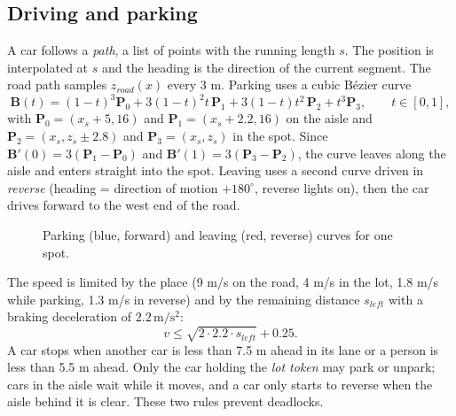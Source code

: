 \subsection{Driving and parking}
A car follows a \emph{path}, a list of points with the running length $s$. The position is interpolated at $s$ and the
heading is the direction of the current segment. The road path samples $z_{road}(x)$ every 3 m. Parking uses a cubic
Bézier curve
\[
\mathbf{B}(t) = (1-t)^3\mathbf{P}_0 + 3(1-t)^2t\,\mathbf{P}_1 + 3(1-t)t^2\,\mathbf{P}_2 + t^3\mathbf{P}_3,\qquad t\in[0,1],
\]
with $\mathbf{P}_0=(x_s+5,16)$ and $\mathbf{P}_1=(x_s+2.2,16)$ on the aisle and $\mathbf{P}_2=(x_s,z_s\pm2.8)$ and
$\mathbf{P}_3=(x_s,z_s)$ in the spot. Since $\mathbf{B}'(0)=3(\mathbf{P}_1-\mathbf{P}_0)$ and $\mathbf{B}'(1)=3(\mathbf{P}_3-\mathbf{P}_2)$,
the curve leaves along the aisle and enters straight into the spot. Leaving uses a second curve driven in
\emph{reverse} (heading = direction of motion $+180^\circ$, reverse lights on), then the car drives forward to the west end
of the road.
\begin{figure}[H]
\centering
{}
\caption{Parking (blue, forward) and leaving (red, reverse) curves for one spot.}
\end{figure}
The speed is limited by the place (9 m/s on the road, 4 m/s in the lot, 1.8 m/s while parking, 1.3 m/s in reverse) and
by the remaining distance $s_{left}$ with a braking deceleration of $2.2\,\mathrm{m/s^2}$:
\[
v\le\sqrt{2\cdot2.2\cdot s_{left}}+0.25 .
\]
A car stops when another car is less than 7.5 m ahead in its lane or a person is less than 5.5 m ahead. Only the car
holding the \emph{lot token} may park or unpark; cars in the aisle wait while it moves, and a car only starts to
reverse when the aisle behind it is clear. These two rules prevent deadlocks.


